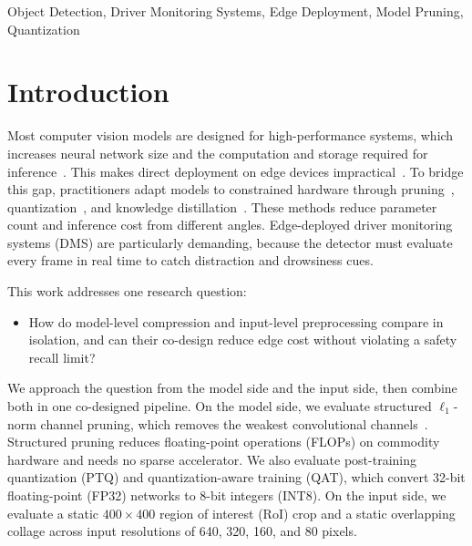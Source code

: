\documentclass[conference]{IEEEtran}
\begin{document}
\begin{IEEEkeywords}
Object Detection, Driver Monitoring Systems, Edge Deployment, Model Pruning, Quantization
\end{IEEEkeywords}


\section{Introduction}
Most computer vision models are designed for high-performance systems, which increases neural network size and the computation and storage required for inference~\cite{b1}. This makes direct deployment on edge devices impractical~\cite{b2,b3}. To bridge this gap, practitioners adapt models to constrained hardware through pruning~\cite{b4}, quantization~\cite{b5}, and knowledge distillation~\cite{b6}. These methods reduce parameter count and inference cost from different angles. Edge-deployed driver monitoring systems (DMS) are particularly demanding, because the detector must evaluate every frame in real time to catch distraction and drowsiness cues.

This work addresses one research question:
\begin{itemize}
    \item How do model-level compression and input-level preprocessing compare in isolation, and can their co-design reduce edge cost without violating a safety recall limit?
\end{itemize}

We approach the question from the model side and the input side, then combine both in one co-designed pipeline. On the model side, we evaluate structured $\ell_1$-norm channel pruning, which removes the weakest convolutional channels~\cite{b9}. Structured pruning reduces floating-point operations (FLOPs) on commodity hardware and needs no sparse accelerator. We also evaluate post-training quantization (PTQ) and quantization-aware training (QAT), which convert 32-bit floating-point (FP32) networks to 8-bit integers (INT8). On the input side, we evaluate a static $400\times400$ region of interest (RoI) crop and a static overlapping collage across input resolutions of 640, 320, 160, and 80 pixels.
\end{document}
